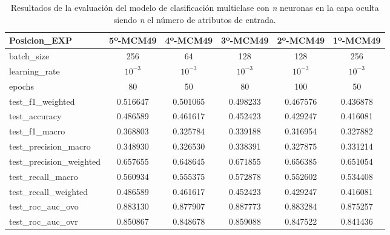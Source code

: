 \begin{table}[H]
\begin{tabular}{|>{\columncolor[HTML]{E0FFFF}}l|c|c|c|c|c|}
\hline
Posicion\_EXP & 5º-MCM49 & 4º-MCM49 & 3º-MCM49 & 2º-MCM49 & 1º-MCM49 \\
\hline
\cellcolor[HTML]{E0FFFF}batch\_size & \cellcolor[HTML]{66ffa8}256 & \cellcolor[HTML]{66ffa8}64 & \cellcolor[HTML]{66ffa8}128 & \cellcolor[HTML]{66ffa8}128 & \cellcolor[HTML]{66ffa8}256 \\
\cellcolor[HTML]{E0FFFF}learning\_rate & \cellcolor[HTML]{f99595}$10^{-3}$ & \cellcolor[HTML]{f99595}$10^{-3}$ & \cellcolor[HTML]{f99595}$10^{-3}$ & \cellcolor[HTML]{f99595}$10^{-3}$ & \cellcolor[HTML]{f99595}$10^{-3}$ \\
\cellcolor[HTML]{E0FFFF}epochs & \cellcolor[HTML]{b1bafb}80 & \cellcolor[HTML]{b1bafb}50 & \cellcolor[HTML]{b1bafb}80 & \cellcolor[HTML]{b1bafb}100 & \cellcolor[HTML]{b1bafb}50 \\
\cellcolor[HTML]{E0FFFF}test\_f1\_weighted & 0.516647 & 0.501065 & 0.498233 & 0.467576 & 0.436878 \\
\cellcolor[HTML]{E0FFFF}test\_accuracy & 0.486589 & 0.461617 & 0.452423 & 0.429247 & 0.416081 \\
\cellcolor[HTML]{E0FFFF}test\_f1\_macro & 0.368803 & 0.325784 & 0.339188 & 0.316954 & 0.327882 \\
\cellcolor[HTML]{E0FFFF}test\_precision\_macro & 0.348930 & 0.326530 & 0.338391 & 0.327875 & 0.331214 \\
\cellcolor[HTML]{E0FFFF}test\_precision\_weighted & 0.657655 & 0.648645 & 0.671855 & 0.656385 & 0.651054 \\
\cellcolor[HTML]{E0FFFF}test\_recall\_macro & 0.560934 & 0.555375 & 0.572878 & 0.552602 & 0.534408 \\
\cellcolor[HTML]{E0FFFF}test\_recall\_weighted & 0.486589 & 0.461617 & 0.452423 & 0.429247 & 0.416081 \\
\cellcolor[HTML]{E0FFFF}test\_roc\_auc\_ovo & 0.883130 & 0.877907 & 0.887773 & 0.883284 & 0.875257 \\
\cellcolor[HTML]{E0FFFF}test\_roc\_auc\_ovr & 0.850867 & 0.848678 & 0.859088 & 0.847522 & 0.841436 \\
\hline
\end{tabular}
    \caption{Resultados de la evaluación del modelo de clasificación multiclase con \textit{n} neuronas en la capa oculta siendo \textit{n} el número de atributos de entrada.}
    \label{fig:EVALMCM49}
\end{table}


